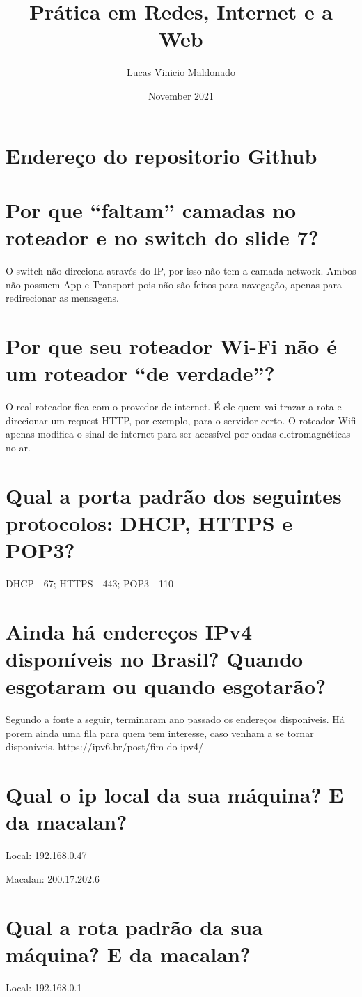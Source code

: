 \documentclass{article}
\title{Prática em Redes, Internet e a Web}
\author{Lucas Vinicio Maldonado}
\date{November 2021}
\begin{document}
\maketitle
\section{Endereço do repositorio Github}

\section{Por que “faltam” camadas no roteador e no switch do slide 7?}
O switch  não direciona através do IP, por isso não tem a camada network. Ambos não possuem App e Transport pois não são feitos para navegação, apenas para redirecionar as mensagens.

\section{Por que seu roteador Wi-Fi não é um roteador “de verdade”?}
O real roteador fica com o provedor de internet. É ele quem vai trazar a rota e direcionar um request HTTP, por exemplo, para o servidor certo. O roteador Wifi apenas modifica o sinal de internet para ser acessível por ondas eletromagnéticas no ar.

\section{Qual a porta padrão dos seguintes protocolos: DHCP, HTTPS e POP3?}
DHCP - 67; 
HTTPS - 443;
POP3 - 110


\section{Ainda há endereços IPv4 disponíveis no Brasil? Quando esgotaram ou quando esgotarão?}
Segundo a fonte a seguir, terminaram ano passado os endereços disponiveis. Há porem ainda uma fila para quem tem interesse, caso venham a se tornar disponíveis.
https://ipv6.br/post/fim-do-ipv4/

\section{Qual o ip local da sua máquina? E da macalan?}
Local: 192.168.0.47

Macalan: 200.17.202.6

\section{Qual a rota padrão da sua máquina? E da macalan?}
Local: 192.168.0.1
\end{document}
